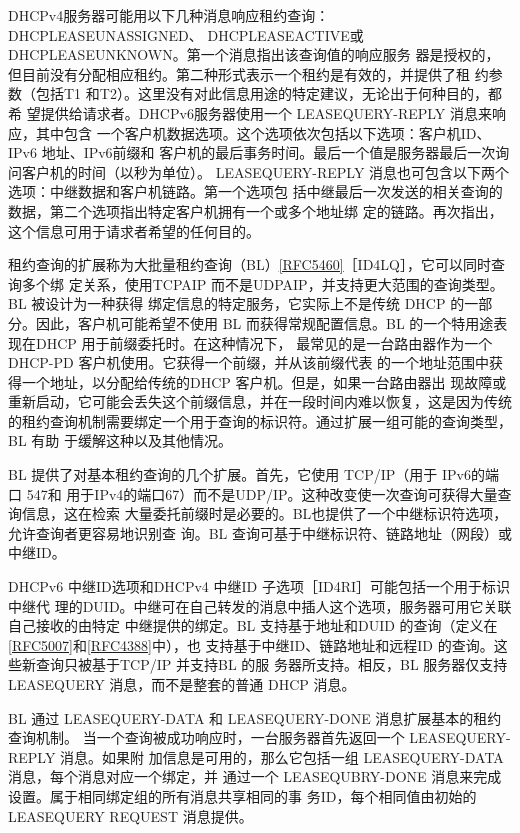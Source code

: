 DHCPv4服务器可能用以下几种消息响应租约查询：DHCPLEASEUNASSIGNED、
DHCPLEASEACTIVE或 DHCPLEASEUNKNOWN。第一个消息指出该查询值的响应服务
器是授权的，但目前没有分配相应租约。第二种形式表示一个租约是有效的，并提供了租
约参数（包括T1 和T2）。这里没有对此信息用途的特定建议，无论出于何种目的，都希
望提供给请求者。DHCPv6服务器使用一个 LEASEQUERY-REPLY 消息来响应，其中包含
一个客户机数据选项。这个选项依次包括以下选项：客户机ID、IPv6 地址、IPv6前缀和
客户机的最后事务时间。最后一个值是服务器最后一次询问客户机的时间（以秒为单位）。
LEASEQUERY-REPLY 消息也可包含以下两个选项：中继数据和客户机链路。第一个选项包
括中继最后一次发送的相关查询的数据，第二个选项指出特定客户机拥有一个或多个地址绑
定的链路。再次指出，这个信息可用于请求者希望的任何目的。

租约查询的扩展称为大批量租约查询（BL）\href{https://www.rfc-editor.org/rfc/rfc5460}{\href{https://www.rfc-editor.org/rfc/rfc5460}{[RFC5460]}}［ID4LQ］，它可以同时查询多个绑
定关系，使用TCPAIP 而不是UDPAIP，并支持更大范围的查询类型。BL 被设计为一种获得
绑定信息的特定服务，它实际上不是传统 DHCP 的一部分。因此，客户机可能希望不使用
BL 而获得常规配置信息。BL 的一个特用途表现在DHCP 用于前缀委托时。在这种情况下，
最常见的是一台路由器作为一个 DHCP-PD 客户机使用。它获得一个前缀，并从该前缀代表
的一个地址范围中获得一个地址，以分配给传统的DHCP 客户机。但是，如果一台路由器出
现故障或重新启动，它可能会丢失这个前缀信息，并在一段时间内难以恢复，这是因为传统
的租约查询机制需要绑定一个用于查询的标识符。通过扩展一组可能的查询类型，BL 有助
于缓解这种以及其他情况。

BL 提供了对基本租约查询的几个扩展。首先，它使用 TCP/IP（用于 IPv6的端口 547和
用于IPv4的端口67）而不是UDP/IP。这种改变使一次查询可获得大量查询信息，这在检索
大量委托前缀时是必要的。BL也提供了一个中继标识符选项，允许查询者更容易地识别查
询。BL 查询可基于中继标识符、链路地址（网段）或中继ID。

DHCPv6 中继ID选项和DHCPv4 中继ID 子选项［ID4RI］可能包括一个用于标识中继代
理的DUID。中继可在自己转发的消息中插人这个选项，服务器可用它关联自己接收的由特定
中继提供的绑定。BL 支持基于地址和DUID
的查询（定义在\href{https://www.rfc-editor.org/rfc/rfc5007}{\href{https://www.rfc-editor.org/rfc/rfc5007}{[RFC5007]}}和\href{https://www.rfc-editor.org/rfc/rfc4388}{\href{https://www.rfc-editor.org/rfc/rfc4388}{[RFC4388]}}中），也
支持基于中继ID、链路地址和远程ID 的查询。这些新查询只被基于TCP/IP 并支持BL 的服
务器所支持。相反，BL 服务器仅支持 LEASEQUERY 消息，而不是整套的普通 DHCP 消息。

BL 通过 LEASEQUERY-DATA 和 LEASEQUERY-DONE 消息扩展基本的租约查询机制。
当一个查询被成功响应时，一台服务器首先返回一个 LEASEQUERY-REPLY 消息。如果附
加信息是可用的，那么它包括一组 LEASEQUERY-DATA 消息，每个消息对应一个绑定，并
通过一个 LEASEQUBRY-DONE 消息来完成设置。属于相同绑定组的所有消息共享相同的事
务ID，每个相同值由初始的 LEASEQUERY REQUEST 消息提供。

